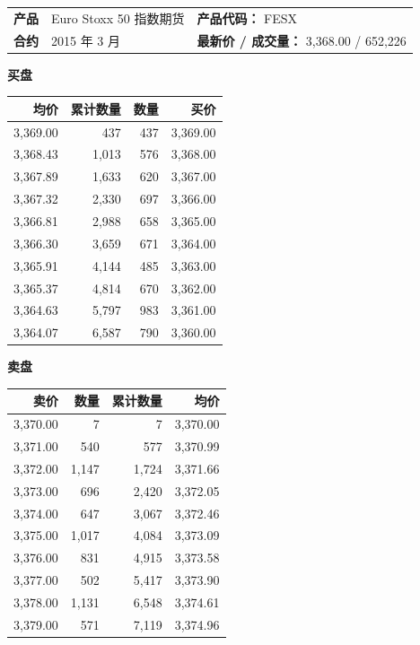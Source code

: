\medskip

\begingroup \scriptsize \setlength{\tabcolsep}{4pt} \renewcommand{\arraystretch}{1.08} \begin{chinesetableblock} \noindent\begin{tabularx}{\textwidth}{@{} lXl@{}}\textbf{产品} & Euro Stoxx 50 指数期货 & \textbf{产品代码：} FESX \\
\textbf{合约} & 2015 年 3 月 & \textbf{最新价 / 成交量：} 3,368.00 / 652,226 \\
\end{tabularx}
\end{chinesetableblock}

\medskip

\noindent \begin{minipage}[t]{0.48\textwidth} \centering \begingroup\color{\chinesebodycolorname} \textbf{买盘}

\smallskip \begin{tabular}{@{} rrrr@{}}
\toprule
均价 & 累计数量 & 数量 & 买价 \\
\midrule
3,369.00 & 437 & 437 & 3,369.00 \\
3,368.43 & 1,013 & 576 & 3,368.00 \\
3,367.89 & 1,633 & 620 & 3,367.00 \\
3,367.32 & 2,330 & 697 & 3,366.00 \\
3,366.81 & 2,988 & 658 & 3,365.00 \\
3,366.30 & 3,659 & 671 & 3,364.00 \\
3,365.91 & 4,144 & 485 & 3,363.00 \\
3,365.37 & 4,814 & 670 & 3,362.00 \\
3,364.63 & 5,797 & 983 & 3,361.00 \\
3,364.07 & 6,587 & 790 & 3,360.00 \\
\bottomrule
\end{tabular}
\endgroup \end{minipage}\hfill \begin{minipage}[t]{0.48\textwidth} \centering \begingroup\color{\chinesebodycolorname} \textbf{卖盘}

\smallskip \begin{tabular}{@{} rrrr@{}}
\toprule
卖价 & 数量 & 累计数量 & 均价 \\
\midrule
3,370.00 & 7 & 7 & 3,370.00 \\
3,371.00 & 540 & 577 & 3,370.99 \\
3,372.00 & 1,147 & 1,724 & 3,371.66 \\
3,373.00 & 696 & 2,420 & 3,372.05 \\
3,374.00 & 647 & 3,067 & 3,372.46 \\
3,375.00 & 1,017 & 4,084 & 3,373.09 \\
3,376.00 & 831 & 4,915 & 3,373.58 \\
3,377.00 & 502 & 5,417 & 3,373.90 \\
3,378.00 & 1,131 & 6,548 & 3,374.61 \\
3,379.00 & 571 & 7,119 & 3,374.96 \\
\bottomrule
\end{tabular}
\endgroup \end{minipage}
